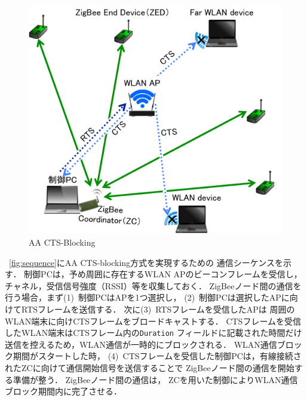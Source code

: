 \documentclass[technicalreport]{ieicej}
\begin{document}
\begin{figure}[bt]
 \centering
 \includegraphics[width=\columnwidth]{figure/aa_cts_blocking.pdf}
 \caption{AA CTS-Blocking}
 \label{fig:aa_cts_blocking}
\end{figure}

\figurename~\ref{fig:sequence}にAA CTS-blocking方式を実現するための
通信シーケンスを示す．
制御PCは，予め周囲に存在するWLAN APのビーコンフレームを受信し，
チャネル，受信信号強度（RSSI）等を収集しておく．
ZigBeeノード間の通信を行う場合，まず(1)~制御PCはAPを1つ選択し，
(2)~制御PCは選択したAPに向けてRTSフレームを送信する．
次に(3)~RTSフレームを受信したAPは
周囲のWLAN端末に向けCTSフレームをブロードキャストする．
CTSフレームを受信したWLAN端末はCTSフレーム内の\texttt{Duration}
フィールドに記載された時間だけ送信を控えるため，WLAN通信が一時的にブロックされる．
WLAN通信ブロック期間がスタートした時，
(4)~CTSフレームを受信した制御PCは，有線接続されたZCに向けて通信開始信号を送信することで
ZigBeeノード間の通信を開始する準備が整う．
ZigBeeノード間の通信は，
ZCを用いた制御によりWLAN通信ブロック期間内に完了させる．
\end{document}
